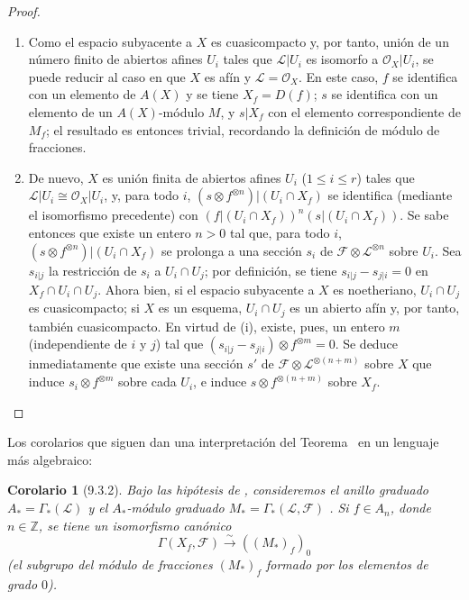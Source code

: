 \documentclass[oneside]{amsart}
\theoremstyle{ega-env-style}
\theoremstyle{ega-thm-env-style}
\newtheorem*{corollary}{Corolario}
\theoremstyle{ega-defn-env-style}
\def\leq{\leqslant}                 %
\newcommand{\oldpage}[2][]{{\marginnote{\normalfont{\textbf{#1}~|~#2}}}\ignorespaces}
\let\EGAOriginalLabel\label
\renewcommand{\label}[1]{\phantomsection\EGAOriginalLabel{#1}}
\begin{document}
\begin{proof}
\medskip\noindent
\begin{enumerate}
  \item[(i)] Como el espacio subyacente a $X$ es cuasicompacto y, por tanto, unión de
    un número finito de abiertos afines $U_i$ tales que $\mathscr{L}|U_i$ es isomorfo a
    $\mathscr{O}_X|U_i$, se puede reducir al caso en que $X$ es afín y $\mathscr{L}=\mathscr{O}_X$.
    En este caso, $f$ se identifica con un elemento de $A(X)$ y se tiene
    $X_f=D(f)$; $s$ se identifica con un elemento de un $A(X)$-módulo $M$, y
    $s|X_f$ con el elemento correspondiente de $M_f$; el resultado es entonces trivial,
    recordando la definición de módulo de fracciones.
\oldpage[I]{173}
  \item[(ii)] De nuevo, $X$ es unión finita de abiertos afines $U_i$ ($1\leq i\leq r$)
    tales que $\mathscr{L}|U_i\cong\mathscr{O}_X|U_i$, y, para todo $i$,
    $(s\otimes f^{\otimes n})|(U_i\cap X_f)$ se identifica (mediante el isomorfismo
    precedente) con $(f|(U_i\cap X_f))^n(s|(U_i\cap X_f))$. Se sabe entonces
     que existe un entero $n>0$ tal que, para todo
    $i$, $(s\otimes f^{\otimes n})|(U_i\cap X_f)$ se prolonga a una sección $s_i$ de
    $\mathscr{F}\otimes\mathscr{L}^{\otimes n}$ sobre $U_i$. Sea $s_{i|j}$ la restricción
    de $s_i$ a $U_i\cap U_j$; por definición, se tiene $s_{i|j}-s_{j|i}=0$ en
    $X_f\cap U_i\cap U_j$. Ahora bien, si el espacio subyacente a $X$ es noetheriano, $U_i\cap U_j$ es
    cuasicompacto; si $X$ es un esquema, $U_i\cap U_j$ es un abierto afín
     y, por tanto, también cuasicompacto. En virtud de (i), existe, pues,
    un entero $m$ (independiente de $i$ y $j$) tal que
    $(s_{i|j}-s_{j|i})\otimes f^{\otimes m}=0$. Se deduce inmediatamente que
    existe una sección $s'$ de $\mathscr{F}\otimes\mathscr{L}^{\otimes(n+m)}$ sobre $X$ que
    induce $s_i\otimes f^{\otimes m}$ sobre cada $U_i$, e induce
    $s\otimes f^{\otimes(n+m)}$ sobre $X_f$.
\end{enumerate}
\end{proof}

Los corolarios que siguen dan una interpretación del Teorema~ en un lenguaje
más algebraico:
\begin{corollary}[9.3.2]
\label{I.9.3.2}
Bajo las hipótesis de , consideremos el anillo graduado $A_* = \Gamma_*(\mathscr{L})$
y el $A_*$-módulo graduado $M_* = \Gamma_*(\mathscr{L},\mathscr{F})$ . Si $f\in A_n$,
donde $n\in\mathbb{Z}$, se tiene un isomorfismo canónico
\[
  \Gamma(X_f,\mathscr{F})\xrightarrow{\sim}((M_*)_f)_0
\] \textup{(el subgrupo del módulo de fracciones
$(M_*)_f$ formado por los elementos de grado $0$)}.
\end{corollary}
\end{document}
